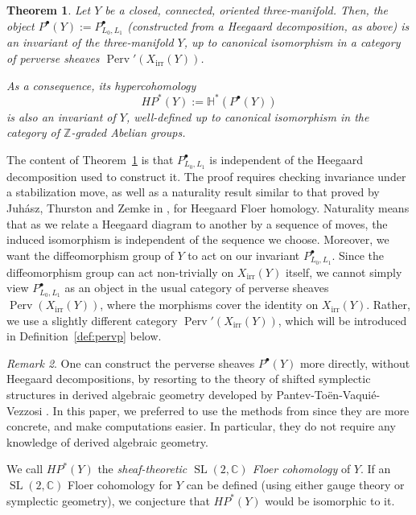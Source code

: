 \documentclass [11pt]{amsart}
\newtheorem {theorem}{Theorem}[section]
\theoremstyle{remark}
\newtheorem {remark}[theorem]{Remark}
\def\zz {{\mathbb{Z}}}
\def\cc {{\mathbb{C}}}
\def\Z {\zz}
\def\HP{\mathit{HP}}
\def\HH{\mathbb{H}}
\def\sl {{\operatorname{SL}(2, \cc)}}
\def\Char {X}
\def\CharIrr {\Char_{\operatorname{irr}}}
\def\Perv {\operatorname{Perv}}
\begin{document}
\begin{theorem}
\label{thm:main1}
Let $Y$ be a closed, connected, oriented three-manifold. Then, the object $P^{\bullet}(Y):=P^{\bullet}_{L_0, L_1}$ (constructed from a Heegaard decomposition, as above) is an invariant of the three-manifold $Y$, up to canonical isomorphism in a category of perverse sheaves $\Perv'(\CharIrr(Y))$.

As a consequence, its hypercohomology
$$  \HP^*(Y) := \HH^*( P^{\bullet}(Y))$$
is also an invariant of $Y$, well-defined up to canonical isomorphism in the category of $\Z$-graded Abelian groups. 
\end{theorem}

The content of Theorem~\ref{thm:main1} is that $P^{\bullet}_{L_0, L_1}$ is independent of the Heegaard decomposition used to construct it. The proof requires checking invariance under a stabilization move, as well as a naturality result similar to that proved by Juh\'asz, Thurston and Zemke in \cite{JuhaszThurston}, for Heegaard Floer homology. Naturality means that as we relate a Heegaard diagram to another by a sequence of moves, the induced isomorphism is independent of the sequence we choose. Moreover, we want the diffeomorphism group of $Y$ to act on our invariant $P^{\bullet}_{L_0, L_1}$. Since the diffeomorphism group can act non-trivially on $\CharIrr(Y)$ itself, we cannot simply view $P^{\bullet}_{L_0, L_1}$ as an object in the usual category of perverse sheaves $\Perv(\CharIrr(Y))$, where the morphisms cover the identity on $\CharIrr(Y)$. Rather, we use a slightly different category $\Perv'(\CharIrr(Y))$, which will be introduced in Definition~\ref{def:pervp} below.

\begin{remark}
\label{rem:PTVV}
One can construct the perverse sheaves $P^{\bullet}(Y)$ more directly, without Heegaard decompositions, by resorting to the theory of shifted symplectic structures in derived algebraic geometry developed by Pantev-To\"en-Vaqui\'e-Vezzosi \cite{PTVV}. In this paper, we preferred to use the methods from \cite{Bussi} since they are more concrete, and make computations easier. In particular, they do not require any knowledge of derived algebraic geometry.
\end{remark}

We call $\HP^*(Y)$ the {\em sheaf-theoretic $\sl$ Floer cohomology} of $Y$. If an $\sl$ Floer cohomology for $Y$ can be defined (using either gauge theory or symplectic geometry), we conjecture that $\HP^*(Y)$ would be isomorphic to it.
\end{document}
